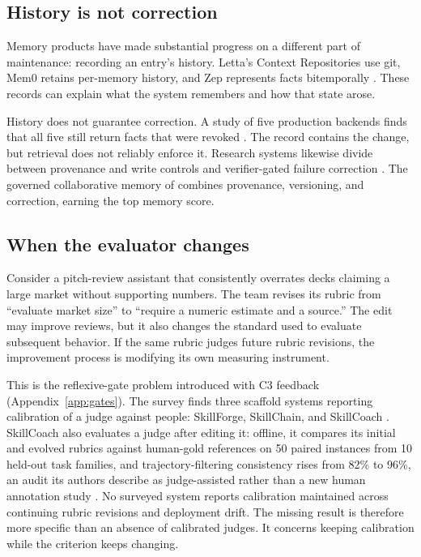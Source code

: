 \subsection{History is not correction}\label{history-is-not-correction}

Memory products have made substantial progress on a different part of maintenance: recording an entry's history. Letta's Context Repositories use git, Mem0 retains per-memory history, and Zep represents facts bitemporally \citep{letta2026memfs, mem02026history, zep2026facts}. These records can explain what the system remembers and how that state arose.

History does not guarantee correction. A study of five production backends finds that all five still return facts that were revoked \citep{shen2026revoked}. The record contains the change, but retrieval does not reliably enforce it. Research systems likewise divide between provenance and write controls \citep{wang2026toki, xu2026ppmf, margalit2026governed, sun2026vermem} and verifier-gated failure correction \citep{yu2026recuris, wang2026memguard}. The governed collaborative memory of \citet{cuadros2026governed} combines provenance, versioning, and correction, earning the top memory score.

\subsection{When the evaluator changes}\label{when-the-evaluator-changes}

Consider a pitch-review assistant that consistently overrates decks claiming a large market without supporting numbers. The team revises its rubric from ``evaluate market size'' to ``require a numeric estimate and a source.'' The edit may improve reviews, but it also changes the standard used to evaluate subsequent behavior. If the same rubric judges future rubric revisions, the improvement process is modifying its own measuring instrument.

This is the reflexive-gate problem introduced with C3 feedback (Appendix~\ref{app:gates}). The survey finds three scaffold systems reporting calibration of a judge against people: SkillForge, SkillChain, and SkillCoach \citep{skillforge2026, hu2026skillchain, zhu2026skillcoach}. SkillCoach also evaluates a judge after editing it: offline, it compares its initial and evolved rubrics against human-gold references on 50 paired instances from 10 held-out task families, and trajectory-filtering consistency rises from 82\% to 96\%, an audit its authors describe as judge-assisted rather than a new human annotation study \citep{zhu2026skillcoach}. No surveyed system reports calibration maintained across continuing rubric revisions and deployment drift. The missing result is therefore more specific than an absence of calibrated judges. It concerns keeping calibration while the criterion keeps changing.

